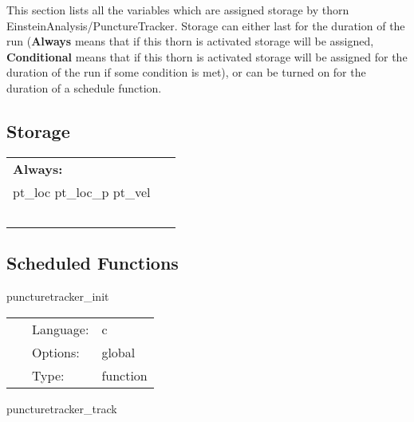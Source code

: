 \noindent This section lists all the variables which are assigned storage by thorn EinsteinAnalysis/PunctureTracker.  Storage can either last for the duration of the run ({\bf Always} means that if this thorn is activated storage will be assigned, {\bf Conditional} means that if this thorn is activated storage will be assigned for the duration of the run if some condition is met), or can be turned on for the duration of a schedule function.


\subsection*{Storage}

\hspace{5mm}

 \begin{tabular*}{160mm}{ll} 

{\bf Always:}&  ~ \\ 
 pt\_loc pt\_loc\_p pt\_vel & ~\\ 
~ & ~\\ 
\end{tabular*} 


\subsection*{Scheduled Functions}
\vspace{5mm}


\hspace{5mm} puncturetracker\_init 

\hspace{5mm}{\it calculate initial location of punctures } 


\hspace{5mm}

 \begin{tabular*}{160mm}{cll} 
~ & Language:  & c \\ 
~ & Options:  & global \\ 
~ & Type:  & function \\ 
\end{tabular*} 


\vspace{5mm}


\hspace{5mm} puncturetracker\_track 

\hspace{5mm}{\it calculate new location of punctures } 


